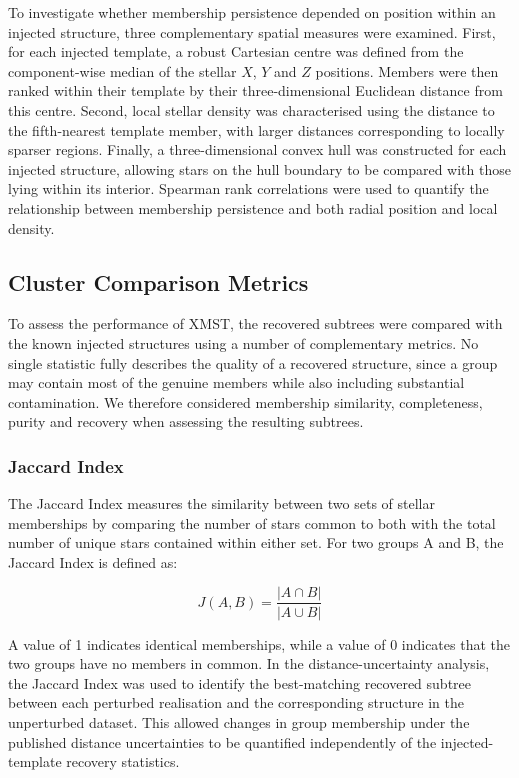 \documentclass[fleqn,usenatbib]{mnras}
\begin{document}
To investigate whether membership persistence depended on position within an
injected structure, three complementary spatial measures were examined.
First, for each injected template, a robust Cartesian centre was defined from
the component-wise median of the stellar $X$, $Y$ and $Z$ positions. Members
were then ranked within their template by their three-dimensional Euclidean
distance from this centre. Second, local stellar density was characterised
using the distance to the fifth-nearest template member, with larger distances
corresponding to locally sparser regions. Finally, a three-dimensional convex
hull was constructed for each injected structure, allowing stars on the hull
boundary to be compared with those lying within its interior. Spearman rank
correlations were used to quantify the relationship between membership
persistence and both radial position and local density.


\subsection{Cluster Comparison Metrics}
To assess the performance of XMST, the recovered subtrees were compared with the known injected structures using a number of complementary metrics. No single statistic fully describes the quality of a recovered structure, since a group may contain most of the genuine members while also including substantial contamination. We therefore considered membership similarity, completeness, purity and recovery when assessing the resulting subtrees.

\subsubsection{Jaccard Index}

The Jaccard Index measures the similarity between two sets of stellar memberships by comparing the number of stars common to both with the total number of unique stars contained within either set. For two groups A and B, the Jaccard Index is defined as:

\begin{equation}
    J(A, B) = \frac{|A \cap B|}{|A \cup B|}
\end{equation}

A value of 1 indicates identical memberships, while a value of 0 indicates that the two groups have no members in common.
In the distance-uncertainty analysis, the Jaccard Index was used to identify the best-matching recovered subtree between each perturbed realisation and the corresponding structure in the unperturbed dataset. This allowed changes in group membership under the published distance uncertainties to be quantified independently of the injected-template recovery statistics.
\end{document}
